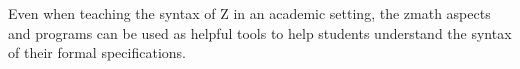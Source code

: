 Even when teaching the syntax of Z in an academic setting, the \gls{zmath} aspects and programs can be used as helpful tools to help students understand the syntax of their formal specifications.
%
%
%
%
%
%
%
